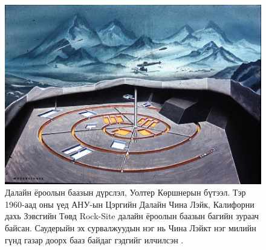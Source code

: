 \documentclass[10pt,twocolumn,letterpaper]{article}
\begin{document}
\begin{figure}[t]
\begin{center}
   \includegraphics[width=1\linewidth]{undersea.jpg}
\end{center}
   \caption{Далайн ёроолын баазын дүрслэл, Уолтер Көршнерын бүтээл. Тэр 1960-аад оны үед АНУ-ын Цэргийн Далайн Чина Лэйк, Калифорни дахь Зэвсгийн Төвд Rock-Site далайн ёроолын баазын багийн зураач байсан. Саудерыйн эх сурвалжуудын нэг нь Чина Лэйкт нэг милийн гүнд газар доорх бааз байдаг гэдгийг илчилсэн \cite{22,23}.}
\label{fig:5}
\label{fig:onecol}
\end{figure}
\end{document}
